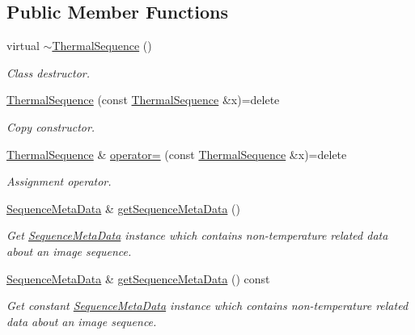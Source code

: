\subsection*{Public Member Functions}
\begin{DoxyCompactItemize}
\item 
virtual \hyperlink{classwtl_1_1_thermal_sequence_a51287347e2d8bfa39344d705bd720ef5}{$\sim$\+Thermal\+Sequence} ()
\begin{DoxyCompactList}\small\item\em Class destructor. \end{DoxyCompactList}\item 
\hyperlink{classwtl_1_1_thermal_sequence_a3f2298f76bddef8ad4368e412550f81d}{Thermal\+Sequence} (const \hyperlink{classwtl_1_1_thermal_sequence}{Thermal\+Sequence} \&x)=delete
\begin{DoxyCompactList}\small\item\em Copy constructor. \end{DoxyCompactList}\item 
\hyperlink{classwtl_1_1_thermal_sequence}{Thermal\+Sequence} \& \hyperlink{classwtl_1_1_thermal_sequence_a85706e752fc1fc7c1748cb2f8bedb42d}{operator=} (const \hyperlink{classwtl_1_1_thermal_sequence}{Thermal\+Sequence} \&x)=delete
\begin{DoxyCompactList}\small\item\em Assignment operator. \end{DoxyCompactList}\item 
\hyperlink{classwtl_1_1_sequence_meta_data}{Sequence\+Meta\+Data} \& \hyperlink{classwtl_1_1_thermal_sequence_a5bbbad98670f6179ce3c349fbe8e3086}{get\+Sequence\+Meta\+Data} ()
\begin{DoxyCompactList}\small\item\em Get \hyperlink{classwtl_1_1_sequence_meta_data}{Sequence\+Meta\+Data} instance which contains non-\/temperature related data about an image sequence. \end{DoxyCompactList}\item 
\hyperlink{classwtl_1_1_sequence_meta_data}{Sequence\+Meta\+Data} \& \hyperlink{classwtl_1_1_thermal_sequence_a04999d96848ef73cc7b9de708f025fa2}{get\+Sequence\+Meta\+Data} () const
\begin{DoxyCompactList}\small\item\em Get constant \hyperlink{classwtl_1_1_sequence_meta_data}{Sequence\+Meta\+Data} instance which contains non-\/temperature related data about an image sequence. \end{DoxyCompactList}\item 

\end{DoxyCompactItemize}
